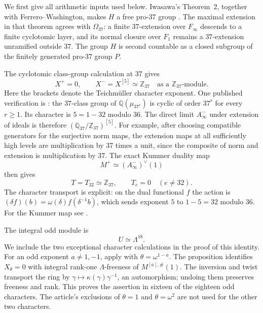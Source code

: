 \documentclass[11pt]{article}
\theoremstyle{definition}\newtheorem{definition}[theorem]{Definition}
\begin{document}
We first give all arithmetic inputs used below.  Iwasawa's
Theorem~2, together with Ferrero--Washington, makes $H$ a free
pro-$37$ group
\cite[Theorem~2, pp.~273--274]{Iwasawa,FW}.
The maximal extension in that theorem agrees with $\Omega_{37}$:
a finite $37$-extension over $F_\infty$ descends to a finite
cyclotomic layer, and its normal closure over $F_1$ remains a
$37$-extension unramified outside $37$.  The group $H$ is
second countable as a closed subgroup of the finitely generated
pro-$37$ group $P$.

The cyclotomic class-group calculation at $37$ gives
\begin{equation}\label{eq:component-p37-class-input}
 X^+=0,\qquad
 X^-=X^{[5]}\simeq\mathbb Z_{37}\quad
 \text{as a $\mathbb Z_{37}$-module}.
\end{equation}
Here the brackets denote the Teichm\"uller character exponent.
One published verification is
\cite[\S1, items~(2)--(3)]{HHO}: the $37$-class group
of $\mathbb Q(\mu_{37^r})$ is cyclic of order $37^r$ for every
$r\ge1$.  Its character is $5=1-32$ modulo $36$.
The direct limit $A_\infty^-$ under extension of ideals is therefore
$(\mathbb Q_{37}/\mathbb Z_{37})^{[5]}$.
For example, after choosing compatible generators for the
surjective norm maps, the extension maps at all sufficiently high
levels are multiplication by $37$ times a unit, since the composite
of norm and extension is multiplication by $37$.
The exact Kummer duality map
\[
 M^+\simeq(A_\infty^-)^\vee(1)
\]
then gives
\begin{equation}\label{eq:component-p37-even}
 T=T_{32}\simeq\mathbb Z_{37},\qquad T_e=0\quad(e\ne32).
\end{equation}
The character transport is explicit: on the dual functional
$f$ the action is $(\delta f)(b)=\omega(\delta)f(\delta^{-1}b)$,
which sends exponent $5$ to $1-5=32$ modulo $36$.
For the Kummer map see
\cite[Theorem~2.3.18]{SharifiCyclotomicNotes}.

The integral odd module is
\begin{equation}\label{eq:component-p37-odd}
 U\simeq\Lambda^{18}.
\end{equation}
We include the two exceptional character calculations in the proof
of this identity.  For an odd exponent $a\ne1,-1$, apply
\cite[Proposition~2.2.6]{WWEOrd} with
$\theta=\omega^{1-a}$.  The proposition identifies $X_\theta=0$
with integral rank-one $\Lambda$-freeness of
$M^{[a],\#}(1)$.  The inversion and twist transport the ring by
$\gamma\mapsto\kappa(\gamma)\gamma^{-1}$, an automorphism; undoing
them preserves freeness and rank.  This proves the assertion in
sixteen of the eighteen odd characters.  The article's exclusions
of $\theta=1$ and $\theta=\omega^2$ are not used for the other
two characters.
\end{document}
